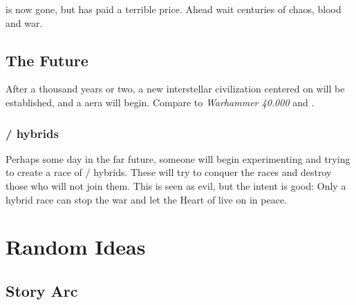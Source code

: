 \begin{garbage}
\Daggerrain{} is now gone, but \Miith{} has paid a terrible price. 
Ahead wait centuries of chaos, blood and war. 














\section{The Future}
After a thousand years or two, a new interstellar civilization centered on \Miith{} will be established, and a  aera will begin. Compare to \emph{Warhammer 40.000} and . 









\subsection{\Resphan/\dragon{} hybrids}
Perhaps some day in the far future, someone will begin experimenting and trying to create a race of \resphan/\dragon{} hybrids. 
These will try to conquer the races and destroy those who will not join them. 
This is seen as evil, but the intent is good: 
Only a hybrid race can stop the war and let the Heart of \Miith{} live on in peace. 























\chapter{Random Ideas}












\section{\Shilred{} Story Arc}

\end{garbage}
